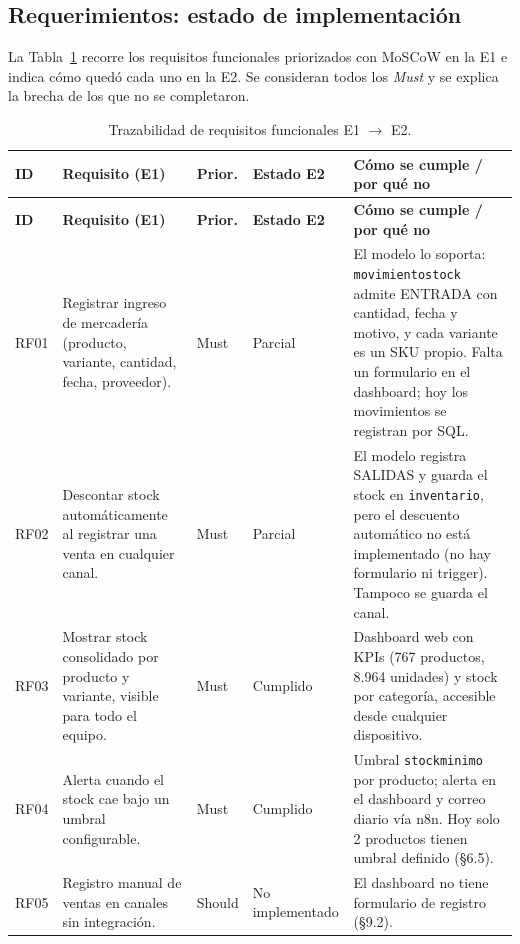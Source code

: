 \documentclass[11pt,letterpaper]{article}
\renewcommand{\_}{\oldus\allowbreak}
\newcommand{\cumple}{Cumplido}
\newcommand{\parcial}{Parcial}
\newcommand{\nocumple}{No implementado}
\begin{document}
\subsection{Requerimientos: estado de implementación}
La Tabla~\ref{tab:rf} recorre los requisitos funcionales priorizados con MoSCoW en la E1 e indica cómo quedó cada uno en la E2. Se consideran todos los \emph{Must} y se explica la brecha de los que no se completaron.

\begin{small}
\begin{longtable}{>{\raggedright\arraybackslash}p{1.0cm} >{\raggedright\arraybackslash}p{3.7cm} >{\raggedright\arraybackslash}p{1.1cm} >{\raggedright\arraybackslash}p{2.0cm} >{\raggedright\arraybackslash}p{5.2cm}}
\caption{Trazabilidad de requisitos funcionales E1 $\rightarrow$ E2.}\label{tab:rf}\\
\toprule
\textbf{ID} & \textbf{Requisito (E1)} & \textbf{Prior.} & \textbf{Estado E2} & \textbf{Cómo se cumple / por qué no} \\
\midrule
\endfirsthead
\toprule
\textbf{ID} & \textbf{Requisito (E1)} & \textbf{Prior.} & \textbf{Estado E2} & \textbf{Cómo se cumple / por qué no} \\
\midrule
\endhead
\bottomrule
\endfoot
RF01 & Registrar ingreso de mercadería (producto, variante, cantidad, fecha, proveedor). & Must & \parcial & El modelo lo soporta: \texttt{movimiento\_stock} admite ENTRADA con cantidad, fecha y motivo, y cada variante es un SKU propio. Falta un formulario en el dashboard; hoy los movimientos se registran por SQL. \\
RF02 & Descontar stock automáticamente al registrar una venta en cualquier canal. & Must & \parcial & El modelo registra SALIDAS y guarda el stock en \texttt{inventario}, pero el descuento automático no está implementado (no hay formulario ni trigger). Tampoco se guarda el canal. \\
RF03 & Mostrar stock consolidado por producto y variante, visible para todo el equipo. & Must & \cumple & Dashboard web con KPIs (767 productos, 8.964 unidades) y stock por categoría, accesible desde cualquier dispositivo. \\
RF04 & Alerta cuando el stock cae bajo un umbral configurable. & Must & \cumple & Umbral \texttt{stock\_minimo} por producto; alerta en el dashboard y correo diario vía n8n. Hoy solo 2 productos tienen umbral definido (§6.5). \\
RF05 & Registro manual de ventas en canales sin integración. & Should & \nocumple & El dashboard no tiene formulario de registro (§9.2). \\

\end{longtable}
\end{small}
\end{document}
